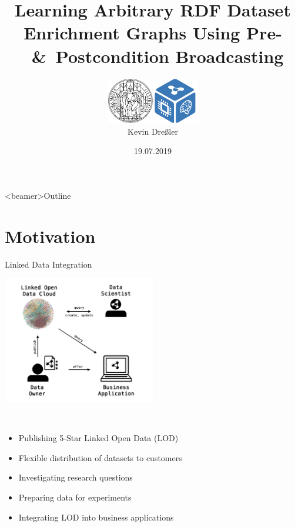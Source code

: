 \documentclass[aspectratio=1610,table]{beamer}
\begin{document}
\title{Learning Arbitrary RDF Dataset Enrichment Graphs Using Pre-~\&~Postcondition Broadcasting}
\author{\includegraphics[height=2cm]{gfx/uni_leipzig_logo}\qquad\includegraphics[height=2cm]{gfx/dice_logo.png}\\\medskip \medskip Kevin Dreßler}
\date{19.07.2019}

{  
\frame{\titlepage}
}
\addtocounter{framenumber}{-1}

{  
\begin{frame}<beamer>{Outline}
    \tableofcontents
\end{frame}
}
\addtocounter{framenumber}{-1}



\section{Motivation}

\begin{frame}{Linked Data Integration}
\begin{multicols}{2}
{\begin{center}
\includegraphics[width=0.5\textwidth]{gfx/flow}\end{center}}
{~~\smallskip
\begin{itemize}[<+->]
  \item Publishing 5-Star Linked Open Data (LOD)
  \item Flexible distribution of datasets to customers
  \item Investigating research questions
  \item Preparing data for experiments
  \item Integrating LOD into business applications
\end{itemize}}
\end{multicols}
\end{frame}
\end{document}
